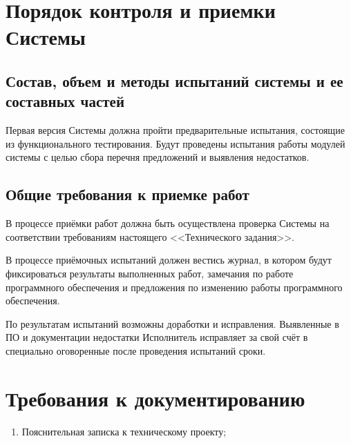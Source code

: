 \chapter{Порядок контроля и приемки Системы}
\section{Состав, объем и методы испытаний системы и ее составных частей}
Первая версия Системы должна пройти предварительные испытания, состоящие из функционального 
тестирования. Будут проведены испытания работы модулей системы с целью сбора перечня 
предложений и выявления недостатков. 

\section{Общие требования к приемке работ}
В процессе приёмки работ должна быть осуществлена проверка Системы на соответствии требованиям 
настоящего <<Технического задания>>.

В процессе приёмочных испытаний должен вестись журнал, в котором будут фиксироваться результаты 
выполненных работ, замечания по работе программного обеспечения и предложения по изменению работы 
программного обеспечения.

По результатам испытаний возможны доработки и исправления. Выявленные в ПО и документации 
недостатки Исполнитель исправляет за свой счёт в специально оговоренные после проведения 
испытаний сроки.

\chapter{Требования к документированию}
\begin{enumerate}
    \item Пояснительная записка к техническому проекту;
\end{enumerate}

\setlength\parindent{15mm}
\stopcontents[sections]
